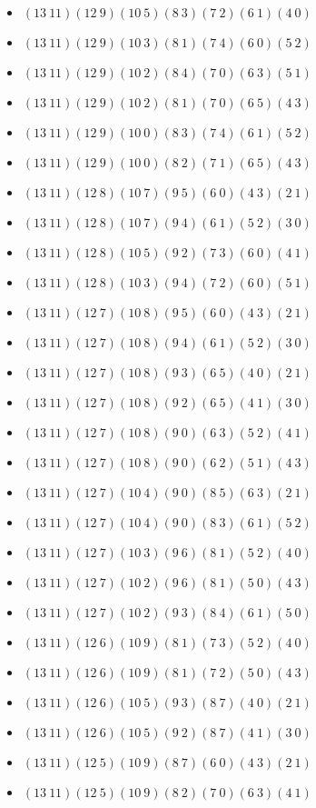 \documentclass{article}
\begin{document}
\begin{itemize}
\item $(13\ 11)(12\ 9)(10\ 5)(8\ 3)(7\ 2)(6\ 1)(4\ 0)$
\item $(13\ 11)(12\ 9)(10\ 3)(8\ 1)(7\ 4)(6\ 0)(5\ 2)$
\item $(13\ 11)(12\ 9)(10\ 2)(8\ 4)(7\ 0)(6\ 3)(5\ 1)$
\item $(13\ 11)(12\ 9)(10\ 2)(8\ 1)(7\ 0)(6\ 5)(4\ 3)$
\item $(13\ 11)(12\ 9)(10\ 0)(8\ 3)(7\ 4)(6\ 1)(5\ 2)$
\item $(13\ 11)(12\ 9)(10\ 0)(8\ 2)(7\ 1)(6\ 5)(4\ 3)$
\item $(13\ 11)(12\ 8)(10\ 7)(9\ 5)(6\ 0)(4\ 3)(2\ 1)$
\item $(13\ 11)(12\ 8)(10\ 7)(9\ 4)(6\ 1)(5\ 2)(3\ 0)$
\item $(13\ 11)(12\ 8)(10\ 5)(9\ 2)(7\ 3)(6\ 0)(4\ 1)$
\item $(13\ 11)(12\ 8)(10\ 3)(9\ 4)(7\ 2)(6\ 0)(5\ 1)$
\item $(13\ 11)(12\ 7)(10\ 8)(9\ 5)(6\ 0)(4\ 3)(2\ 1)$
\item $(13\ 11)(12\ 7)(10\ 8)(9\ 4)(6\ 1)(5\ 2)(3\ 0)$
\item $(13\ 11)(12\ 7)(10\ 8)(9\ 3)(6\ 5)(4\ 0)(2\ 1)$
\item $(13\ 11)(12\ 7)(10\ 8)(9\ 2)(6\ 5)(4\ 1)(3\ 0)$
\item $(13\ 11)(12\ 7)(10\ 8)(9\ 0)(6\ 3)(5\ 2)(4\ 1)$
\item $(13\ 11)(12\ 7)(10\ 8)(9\ 0)(6\ 2)(5\ 1)(4\ 3)$
\item $(13\ 11)(12\ 7)(10\ 4)(9\ 0)(8\ 5)(6\ 3)(2\ 1)$
\item $(13\ 11)(12\ 7)(10\ 4)(9\ 0)(8\ 3)(6\ 1)(5\ 2)$
\item $(13\ 11)(12\ 7)(10\ 3)(9\ 6)(8\ 1)(5\ 2)(4\ 0)$
\item $(13\ 11)(12\ 7)(10\ 2)(9\ 6)(8\ 1)(5\ 0)(4\ 3)$
\item $(13\ 11)(12\ 7)(10\ 2)(9\ 3)(8\ 4)(6\ 1)(5\ 0)$
\item $(13\ 11)(12\ 6)(10\ 9)(8\ 1)(7\ 3)(5\ 2)(4\ 0)$
\item $(13\ 11)(12\ 6)(10\ 9)(8\ 1)(7\ 2)(5\ 0)(4\ 3)$
\item $(13\ 11)(12\ 6)(10\ 5)(9\ 3)(8\ 7)(4\ 0)(2\ 1)$
\item $(13\ 11)(12\ 6)(10\ 5)(9\ 2)(8\ 7)(4\ 1)(3\ 0)$
\item $(13\ 11)(12\ 5)(10\ 9)(8\ 7)(6\ 0)(4\ 3)(2\ 1)$
\item $(13\ 11)(12\ 5)(10\ 9)(8\ 2)(7\ 0)(6\ 3)(4\ 1)$

\end{itemize}
\end{document}
